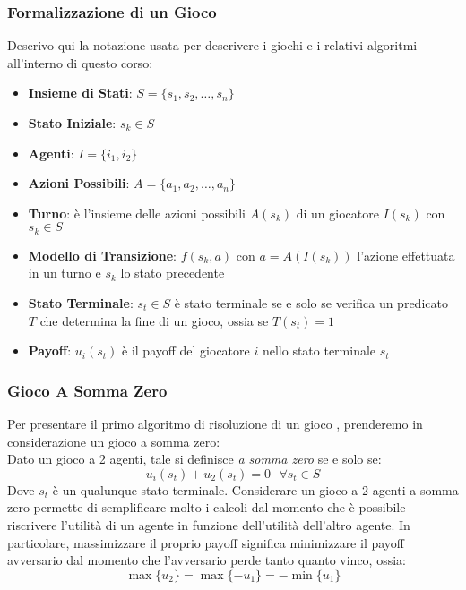 \subsubsection{Formalizzazione di un Gioco}
Descrivo qui la notazione usata per descrivere i giochi e i relativi algoritmi all'interno di questo corso:
\begin{itemize}
    \item \textbf{Insieme di Stati}: $S = \{s_1,s_2, \dots, s_n\}$
    \item \textbf{Stato Iniziale}: $s_k \in S$
    \item \textbf{Agenti}: $I = \{i_1, i_2\}$
    \item \textbf{Azioni Possibili}: $A=\{a_1, a_2, \dots, a_n\}$
    \item \textbf{Turno}: è l'insieme delle azioni possibili $A(s_k)$ di un giocatore $I(s_k)$ con $s_k \in S$
    \item \textbf{Modello di Transizione}: $f(s_k, a)$ con $a = A(I(s_k))$ l'azione effettuata in un turno e $s_k$ lo stato precedente
    \item \textbf{Stato Terminale}: $s_t \in S$ è stato terminale se e solo se verifica un predicato $T$ che determina la fine di un gioco, ossia se $T(s_t) = 1$
    \item \textbf{Payoff}: $u_i(s_t)$ è il payoff del giocatore $i$ nello stato terminale $s_t$
\end{itemize}

\subsubsection{Gioco A Somma Zero}
Per presentare il primo algoritmo di risoluzione di un gioco , prenderemo in considerazione un gioco a somma zero:\\
Dato un gioco a 2 agenti, tale si definisce \textit{a somma zero} se e solo se:
\begin{equation}
    u_i(s_t) + u_2(s_t) = 0 \mbox{    } \forall s_t \in S
\end{equation}
Dove $s_t$ è un qualunque stato terminale.
Considerare un gioco a 2 agenti a somma zero permette di semplificare molto i calcoli dal momento che è possibile riscrivere l'utilità di un agente in funzione dell'utilità dell'altro agente.
In particolare, massimizzare il proprio payoff significa minimizzare il payoff avversario dal momento che l'avversario perde tanto quanto vinco, ossia:
\begin{equation}
    \max\{u_2\} = \max\{-u_1\} = -\min\{u_1\}
\end{equation}

